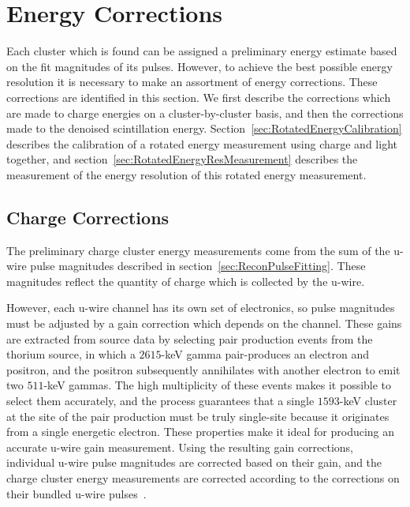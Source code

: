 \section{Energy Corrections}\label{sec:ResultEnergy}

Each cluster which is found can be assigned a preliminary energy estimate based on the fit magnitudes of its pulses.  However, to achieve the best possible energy resolution it is necessary to make an assortment of energy corrections.  These corrections are identified in this section.  We first describe the corrections which are made to charge energies on a cluster-by-cluster basis, and then the corrections made to the denoised scintillation energy.  Section~\ref{sec:RotatedEnergyCalibration} describes the calibration of a rotated energy measurement using charge and light together, and section~\ref{sec:RotatedEnergyResMeasurement} describes the measurement of the energy resolution of this rotated energy measurement.

\subsection{Charge Corrections}\label{sec:ResultEnergyCharge}

The preliminary charge cluster energy measurements come from the sum of the u-wire pulse magnitudes described in section~\ref{sec:ReconPulseFitting}.  These magnitudes reflect the quantity of charge which is collected by the u-wire.

However, each u-wire channel has its own set of electronics, so pulse magnitudes must be adjusted by a gain correction which depends on the channel.  These gains are extracted from source data by selecting pair production events from the thorium source, in which a $2615$-keV gamma pair-produces an electron and positron, and the positron subsequently annihilates with another electron to emit two $511$-keV gammas.  The high multiplicity of these events makes it possible to select them accurately, and the process guarantees that a single $1593$-keV cluster at the site of the pair production must be truly single-site because it originates from a single energetic electron.  These properties make it ideal for producing an accurate u-wire gain measurement.  Using the resulting gain corrections, individual u-wire pulse magnitudes are corrected based on their gain, and the charge cluster energy measurements are corrected according to the corrections on their bundled u-wire pulses~\cite{EnergyDocumentRun2a}.

